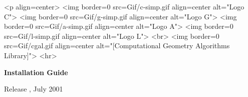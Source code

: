 
\pagestyle{empty}

\begin{titlepage}
  \mbox{} 
  \vspace{3cm}
  \ccTexHtml 
  {\centerline{
        }}
  {<p align=center>
    <img border=0 src=Gif/c-simp.gif align=center alt="Logo C">
    <img border=0 src=Gif/g-simp.gif align=center alt="Logo G">
    <img border=0 src=Gif/a-simp.gif align=center alt="Logo A">
    <img border=0 src=Gif/l-simp.gif align=center alt="Logo L">
    <br>
    <img border=0 src=Gif/cgal.gif align=center 
    alt="[Computational Geometry Algorithms Library]">
    <hr>}

  \vspace{2cm}
  \centerline{ {\huge{\bf Installation Guide}} }
  
  \vspace{2cm}
  \newcommand{\mydate}{July 2001}
  \ccTexHtml
  {\renewcommand{\mydate}{\ifcase\the\month \or January\or
      February\or March\or April\or May\or June\or July\or August\or
      September\or October\or November\or December\fi\ \the\year}}{}
  \centerline{ {\large Release \cgalrelease, \mydate} }
\end{titlepage}

%
\pagestyle{plain}
\setcounter{page}{0}

